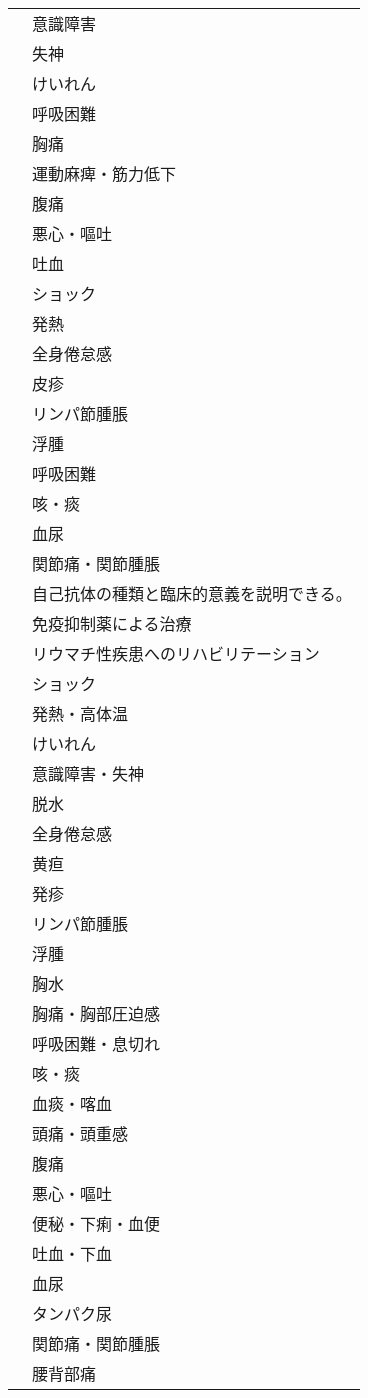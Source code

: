 \begin{xltabular}{\linewidth}{XX}
 & 意識障害 \\
 & 失神 \\
 & けいれん \\
 & 呼吸困難 \\
 & 胸痛 \\
 & 運動麻痺・筋力低下 \\
 & 腹痛 \\
 & 悪心・嘔吐 \\
 & 吐血 \\
 & ショック \\
 & 発熱 \\
 & 全身倦怠感 \\
 & 皮疹 \\
 & リンパ節腫脹 \\
 & 浮腫 \\
 & 呼吸困難 \\
 & 咳・痰 \\
 & 血尿 \\
 & 関節痛・関節腫脹 \\
 & 自己抗体の種類と臨床的意義を説明できる。 \\
 & 免疫抑制薬による治療 \\
 & リウマチ性疾患へのリハビリテーション \\
 & ショック \\
 & 発熱・高体温 \\
 & けいれん \\
 & 意識障害・失神 \\
 & 脱水 \\
 & 全身倦怠感 \\
 & 黄疸 \\
 & 発疹 \\
 & リンパ節腫脹 \\
 & 浮腫 \\
 & 胸水 \\
 & 胸痛・胸部圧迫感 \\
 & 呼吸困難・息切れ \\
 & 咳・痰 \\
 & 血痰・喀血 \\
 & 頭痛・頭重感 \\
 & 腹痛 \\
 & 悪心・嘔吐 \\
 & 便秘・下痢・血便 \\
 & 吐血・下血 \\
 & 血尿 \\
 & タンパク尿 \\
 & 関節痛・関節腫脹 \\
 & 腰背部痛 \\

\end{xltabular}
